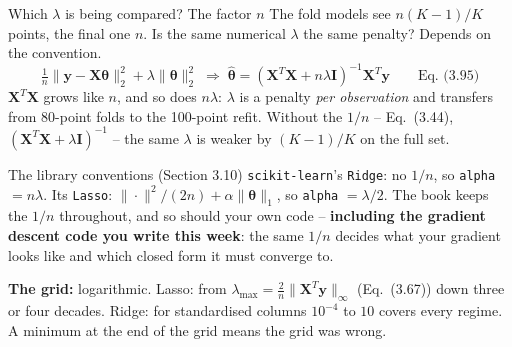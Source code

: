 \documentclass[10pt,aspectratio=169]{beamer}
\begin{document}
\begin{frame}{Which $\lambda$ is being compared?  The factor $n$}
The fold models see $n(K-1)/K$ points, the final one $n$.  Is the same
numerical $\lambda$ the same penalty?  Depends on the convention.
\[
  \tfrac{1}{n}\|\bm{y}-\bm{X}\bm{\theta}\|_2^2+\lambda\|\bm{\theta}\|_2^2
  \;\Rightarrow\;
  \hat{\bm{\theta}}=(\bm{X}^T\bm{X}+n\lambda\bm{I})^{-1}\bm{X}^T\bm{y}
  \qquad\text{Eq.~(3.95)}
\]
$\bm{X}^T\bm{X}$ grows like $n$, and so does $n\lambda$: $\lambda$ is a
penalty \emph{per observation} and transfers from 80-point folds to the
100-point refit.  Without the $1/n$ -- Eq.~(3.44),
$(\bm{X}^T\bm{X}+\lambda\bm{I})^{-1}$ -- the same $\lambda$ is weaker by
$(K-1)/K$ on the full set.
\vspace{3pt}
\begin{block}{The library conventions (Section 3.10)}
\texttt{scikit-learn}'s \texttt{Ridge}: no $1/n$, so \texttt{alpha} $=n\lambda$.
Its \texttt{Lasso}: $\|\cdot\|^2/(2n)+\alpha\|\bm{\theta}\|_1$, so
\texttt{alpha} $=\lambda/2$.  The book keeps the $1/n$ throughout, and so
should your own code -- \textbf{including the gradient descent code you
write this week}: the same $1/n$ decides what your gradient looks like and
which closed form it must converge to.
\end{block}
\vspace{2pt}
\small
\textbf{The grid:} logarithmic.  Lasso: from
$\lambda_{\max}=\tfrac{2}{n}\|\bm{X}^T\bm{y}\|_\infty$ (Eq.~(3.67)) down
three or four decades.  Ridge: for standardised columns $10^{-4}$ to $10$
covers every regime.  A minimum at the end of the grid means the grid was wrong.
\end{frame}
\end{document}
